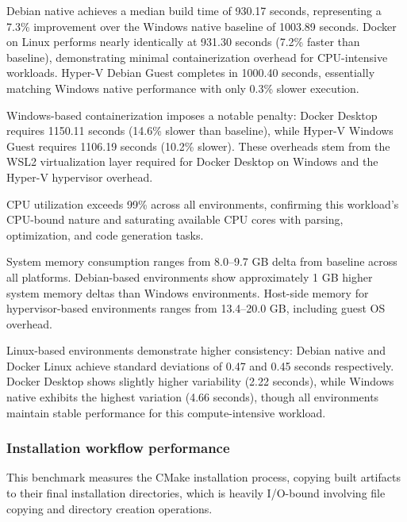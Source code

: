Debian native achieves a median build time of 930.17 seconds, representing a 7.3\% improvement over the Windows native baseline of 1003.89 seconds.
Docker on Linux performs nearly identically at 931.30 seconds (7.2\% faster than baseline), demonstrating minimal containerization overhead for CPU-intensive workloads.
Hyper-V Debian Guest completes in 1000.40 seconds, essentially matching Windows native performance with only 0.3\% slower execution.

Windows-based containerization imposes a notable penalty: Docker Desktop requires 1150.11 seconds (14.6\% slower than baseline), while Hyper-V Windows Guest requires 1106.19 seconds (10.2\% slower).
These overheads stem from the WSL2 virtualization layer required for Docker Desktop on Windows and the Hyper-V hypervisor overhead.

CPU utilization exceeds 99\% across all environments, confirming this workload's CPU-bound nature and saturating available CPU cores with parsing, optimization, and code generation tasks.

System memory consumption ranges from 8.0--9.7 GB delta from baseline across all platforms.
Debian-based environments show approximately 1 GB higher system memory deltas than Windows environments.
Host-side memory for hypervisor-based environments ranges from 13.4--20.0 GB, including guest OS overhead.

Linux-based environments demonstrate higher consistency: Debian native and Docker Linux achieve standard deviations of 0.47 and 0.45 seconds respectively.
Docker Desktop shows slightly higher variability (2.22 seconds), while Windows native exhibits the highest variation (4.66 seconds), though all environments maintain stable performance for this compute-intensive workload.

\subsubsection{Installation workflow performance}
\label{subsec:installation_workflow}

This benchmark measures the CMake installation process, copying built artifacts to their final installation directories, which is heavily I/O-bound involving file copying and directory creation operations.

